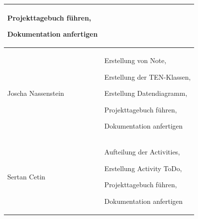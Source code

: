 \begin{longtable}{|p{4cm}|p{10cm}|}
Projekttagebuch führen, 

Dokumentation anfertigen \\ \hline
Joscha Nassenstein & Erstellung von Note, 

Erstellung der TEN-Klassen,  

Erstellung Datendiagramm, 

Projekttagebuch führen, 

Dokumentation anfertigen \\ \hline
Sertan Cetin &  Aufteilung der Activities, 

Erstellung Activity ToDo, 

Projekttagebuch führen, 

Dokumentation anfertigen \\ \hline
\end{longtable}

